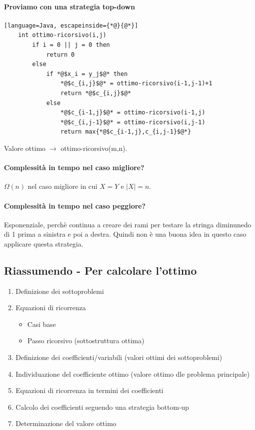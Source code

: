 \paragraph*{Proviamo con una strategia top-down}
\begin{lstlisting}[language=Java, escapeinside={*@}{@*}]
    int ottimo-ricorsivo(i,j)
        if i = 0 || j = 0 then
            return 0
        else
            if *@$x_i = y_j$@* then
                *@$c_{i,j}$@* = ottimo-ricorsivo(i-1,j-1)+1
                return *@$c_{i,j}$@*
            else
                *@$c_{i-1,j}$@* = ottimo-ricorsivo(i-1,j)
                *@$c_{i,j-1}$@* = ottimo-ricorsivo(i,j-1)
                return max{*@$c_{i-1,j},c_{i,j-1}$@*}
\end{lstlisting}
Valore ottimo $\rightarrow$ ottimo-ricorsivo(m,n).
\paragraph*{Complessità in tempo nel caso migliore?} $\Omega(n)$ nel caso migliore in cui $X=Y$ e
$|X|=n$.\\
\paragraph*{Complessità in tempo nel caso peggiore?} Esponenziale, perchè continua a creare dei
rami per testare la stringa diminunedo di 1 prima a sinistra e poi a destra. Quindi non è una
buona idea in questo caso applicare questa strategia.

\subsection{Riassumendo - Per calcolare l'ottimo}
\begin{enumerate}
    \item Definizione dei sottoproblemi
    \item Equazioni di ricorrenza
    \begin{itemize}
        \item Casi base
        \item Passo ricorsivo (sottostruttura ottima)
    \end{itemize}
    \item Definizione dei coefficienti/variabili (valori ottimi dei sottoproblemi)
    \item Individuazione del coefficiente ottimo (valore ottimo dle problema principale)
    \item Equazioni di ricorrenza in termini dei coefficienti
    \item Calcolo dei coefficienti seguendo una strategia bottom-up
    \item Determinazione del valore ottimo
\end{enumerate}

